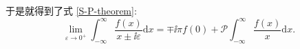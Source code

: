 于是就得到了式 \eqref{S-P-theorem}:
\begin{equation}
    \lim_{\varepsilon\to 0^+}\int_{-\infty}^\infty\frac{f(x)}{x\pm\ii\varepsilon}\mathrm{d}x=\mp\ii\pi f(0)+\mathcal{P}\int_{-\infty}^\infty\frac{f(x)}{x}\mathrm{d}x.
\end{equation}


